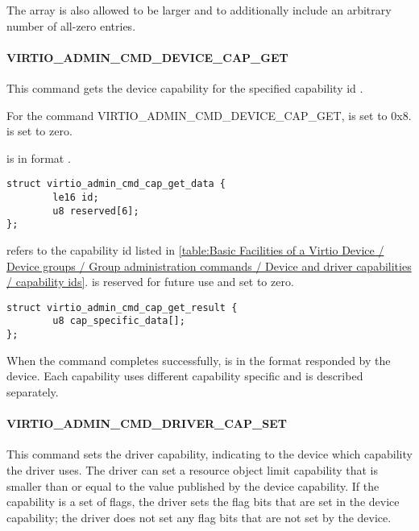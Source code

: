 The array is also allowed to be larger and to additionally include an arbitrary
number of all-zero entries.

\paragraph{VIRTIO_ADMIN_CMD_DEVICE_CAP_GET}\label{par:Basic Facilities of a Virtio Device / Device groups / Group administration commands / Device and driver capabilities / VIRTIO_ADMIN_CMD_DEVICE_CAP_GET}

This command gets the device capability for the specified capability
id .

For the command VIRTIO_ADMIN_CMD_DEVICE_CAP_GET,  is set to 0x8.
 is set to zero.

 is in format
.

\begin{lstlisting}
struct virtio_admin_cmd_cap_get_data {
        le16 id;
        u8 reserved[6];
};
\end{lstlisting}

 refers to the capability id listed in \ref{table:Basic Facilities of a Virtio Device / Device groups / Group administration commands / Device and driver capabilities / capability ids}.
 is reserved for future use and set to zero.

\begin{lstlisting}
struct virtio_admin_cmd_cap_get_result {
        u8 cap_specific_data[];
};
\end{lstlisting}

When the command completes successfully, 
is in the format  responded
by the device. Each capability uses different capability specific
 and is described separately.

\paragraph{VIRTIO_ADMIN_CMD_DRIVER_CAP_SET}\label{par:Basic Facilities of a Virtio Device / Device groups / Group administration commands / Device and driver capabilities / VIRTIO_ADMIN_CMD_DRIVER_CAP_SET}

This command sets the driver capability, indicating to the device which capability
the driver uses. The driver can set a resource object limit capability that is smaller
than or equal to the value published by the device capability.
If the capability is a set of flags, the driver sets the flag bits that are set
in the device capability; the driver does not set any flag bits that are not
set by the device.

